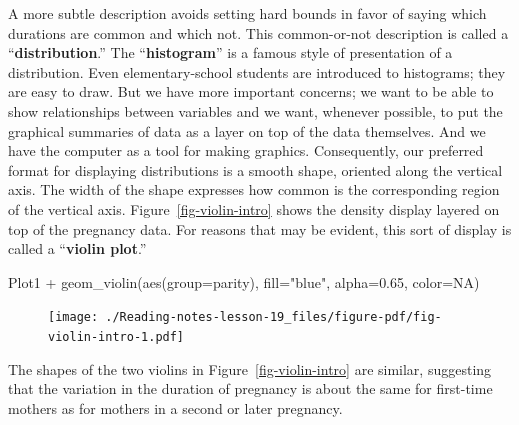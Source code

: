 \documentclass[
  letterpaper,
  DIV=11,
  numbers=noendperiod,
  oneside]{scrreprt}
\newenvironment{Shaded}{\begin{snugshade}}{\end{snugshade}}
\newcommand{\AttributeTok}[1]{\textcolor[rgb]{0.40,0.45,0.13}{#1}}
\newcommand{\ConstantTok}[1]{\textcolor[rgb]{0.56,0.35,0.01}{#1}}
\newcommand{\FloatTok}[1]{\textcolor[rgb]{0.68,0.00,0.00}{#1}}
\newcommand{\FunctionTok}[1]{\textcolor[rgb]{0.28,0.35,0.67}{#1}}
\newcommand{\NormalTok}[1]{\textcolor[rgb]{0.00,0.23,0.31}{#1}}
\newcommand{\SpecialCharTok}[1]{\textcolor[rgb]{0.37,0.37,0.37}{#1}}
\newcommand{\StringTok}[1]{\textcolor[rgb]{0.13,0.47,0.30}{#1}}
\begin{document}
A more subtle description avoids setting hard bounds in favor of saying
which durations are common and which not. This common-or-not description
is called a ``\textbf{distribution}.'' The ``\textbf{histogram}'' is a
famous style of presentation of a distribution. Even elementary-school
students are introduced to histograms; they are easy to draw. But we
have more important concerns; we want to be able to show relationships
between variables and we want, whenever possible, to put the graphical
summaries of data as a layer on top of the data themselves. And we have
the computer as a tool for making graphics. Consequently, our preferred
format for displaying distributions is a smooth shape, oriented along
the vertical axis. The width of the shape expresses how common is the
corresponding region of the vertical axis. Figure~\ref{fig-violin-intro}
shows the density display layered on top of the pregnancy data. For
reasons that may be evident, this sort of display is called a
``\textbf{violin plot}.''

\begin{Shaded}
\begin{Highlighting}[]
\NormalTok{Plot1 }\SpecialCharTok{+}
  \FunctionTok{geom\_violin}\NormalTok{(}\FunctionTok{aes}\NormalTok{(}\AttributeTok{group=}\NormalTok{parity), }\AttributeTok{fill=}\StringTok{"blue"}\NormalTok{, }\AttributeTok{alpha=}\FloatTok{0.65}\NormalTok{, }\AttributeTok{color=}\ConstantTok{NA}\NormalTok{)}
\end{Highlighting}
\end{Shaded}

\begin{figure}[H]


{\centering \texttt{[image: ./Reading-notes-lesson-19\_files/figure-pdf/fig-violin-intro-1.pdf]}

}

\end{figure}

The shapes of the two violins in Figure~\ref{fig-violin-intro} are
similar, suggesting that the variation in the duration of pregnancy is
about the same for first-time mothers as for mothers in a second or
later pregnancy.
\end{document}
